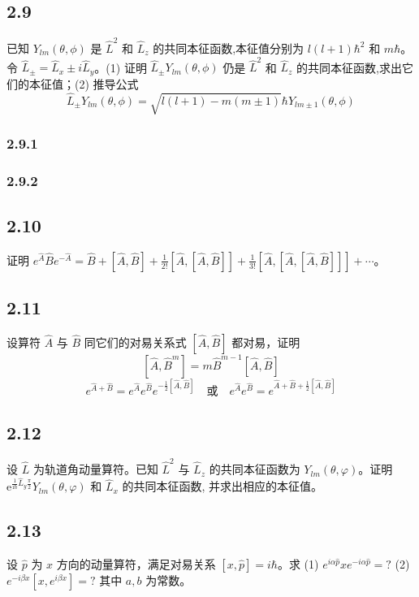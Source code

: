 \subsection{2.9}
已知 $Y_{lm}(\theta, \phi)$ 是 $\hat{L}^2$ 和 $\hat{L}_z$ 的共同本征函数,本征值分别为 $l(l+1)\hbar^2$ 和 $m\hbar$。令 $\hat{L}_{\pm} = \hat{L}_x \pm i \hat{L}_y$。(1) 证明 $\hat{L}_{\pm} Y_{lm}(\theta, \phi)$ 仍是 $\hat{L}^2$ 和 $\hat{L}_z$ 的共同本征函数,求出它们的本征值；(2) 推导公式
$$\hat{L}_{\pm} Y_{lm}(\theta, \phi) = \sqrt{l(l+1) - m(m \pm 1)} \hbar Y_{l m \pm 1}(\theta, \phi)$$

\subsubsection{2.9.1}

\subsubsection{2.9.2}


\subsection{2.10}
证明 $e^{\hat{A}} \hat{B} e^{-\hat{A}} = \hat{B} + [\hat{A}, \hat{B}] + \frac{1}{2!} [\hat{A}, [\hat{A}, \hat{B}]] + \frac{1}{3!} [\hat{A}, [\hat{A}, [\hat{A}, \hat{B}]]] + \cdots$。

\subsection{2.11}
设算符 $\hat{A}$ 与 $\hat{B}$ 同它们的对易关系式 $[\hat{A}, \hat{B}]$ 都对易，证明
$$[\hat{A}, \hat{B}^m] = m \hat{B}^{m-1} [\hat{A}, \hat{B}] \tag{1}$$
$$e^{\hat{A} + \hat{B}} = e^{\hat{A}} e^{\hat{B}} e^{-\frac{1}{2} [\hat{A}, \hat{B}]} \quad \text{或} \quad e^{\hat{A}} e^{\hat{B}} = e^{\hat{A} + \hat{B} + \frac{1}{2} [\hat{A}, \hat{B}]} \tag{2}$$

\subsection{2.12}
设 $\hat{L}$ 为轨道角动量算符。已知 $\hat{L}^2$ 与 $\hat{L}_z$ 的共同本征函数为 $Y_{lm} (\theta, \varphi)$。证明 $\mathrm{e}^{\frac{1}{\mathrm{i}\hbar}\hat{L}_y\frac{\pi}{2}}Y_{lm}(\theta ,\varphi )$ 和 $\hat{L}_x$ 的共同本征函数, 并求出相应的本征值。

\subsection{2.13}
设 $\hat{p}$ 为 $x$ 方向的动量算符，满足对易关系 $[x, \hat{p}] = i\hbar$。求 (1) $e^{i\alpha \hat{p}} x e^{-i\alpha \hat{p}} = ?$ (2) $e^{-i\beta x} [x, e^{i\beta x}] = ?$ 其中 $a, b$ 为常数。

